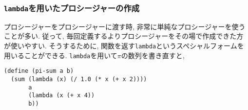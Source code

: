 \subsubsection{\lstinline{lambda}を用いたプロシージャーの作成}
プロシージャーをプロシージャーに渡す時, 非常に単純なプロシージャーを使うことが多い.
従って, 毎回定義するよりプロシージャーをその場で作成できた方が使いやすい.
そうするために, 関数を返す\lstinline{lambda}というスペシャルフォームを用いることができる.
\lstinline{lambda}を用いて$\pi$の数列を書き直すと,

\begin{lstlisting}[basicstyle=\footnotesize,title=一般的な和の関数と\lstinline{lambda}を用いた$\pi$の数列]
(define (pi-sum a b)
  (sum (lambda (x) (/ 1.0 (* x (+ x 2))))
       a
       (lambda (x (+ x 4))
       b))
\end{lstlisting}
